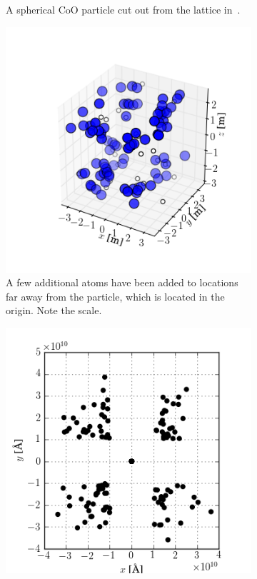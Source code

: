\documentclass[11pt,twoside]{report}
\newcommand{\chem}[1]{\ensuremath{\mathrm{#1}}}
\begin{document}
\begin{figure}[htbp]
\begin{subfigure}{0.45\textwidth}
	  \caption{A spherical \chem{CoO} particle cut out from the lattice in~.}
	  \label{fig:cropped_lattice}	
	\end{subfigure}
	\begin{subfigure}{0.45\textwidth}
	  \includegraphics[width=\textwidth]{img/lattice_cropped_fixed.png}
	  \caption{A few additional atoms have been added to locations far away from the particle, which is located in the origin. Note the scale.}
	  \label{fig:cropped_fixed_lattice}	
	\end{subfigure}
	\hspace{5mm}
	\begin{subfigure}{0.4\textwidth}
	  \includegraphics[width=\textwidth]{img/lattice_cropped_fixed_2d.png}

\end{subfigure}
\end{figure}
\end{document}
